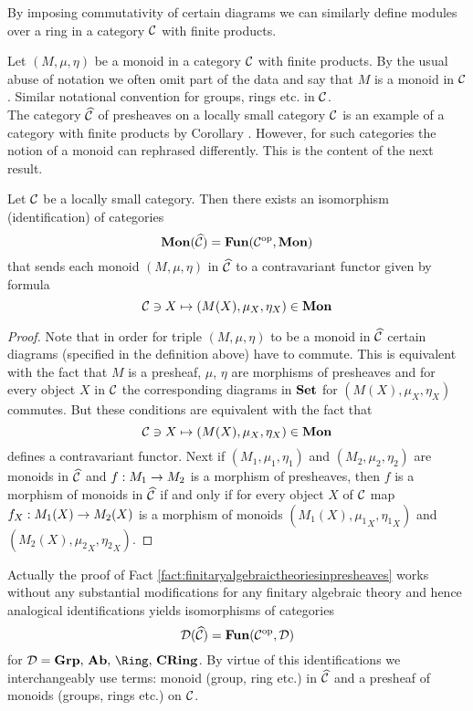 \begin{remark}
By imposing commutativity of certain diagrams we can similarly define modules over a ring in a category ${\mathcal C}$ with finite products.
\end{remark}
\noindent
Let $(M,\mu,\eta)$ be a monoid in a category ${\mathcal C}$ with finite products. By the usual abuse of notation we often omit part of the data and say that $M$ is a monoid in ${\mathcal C}$. Similar notational convention for groups, rings etc. in ${\mathcal C}$.\\
The category $\widehat{{\mathcal C}}$ of presheaves on a locally small category ${\mathcal C}$ is an example of a category with finite products by Corollary . However, for such categories the notion of a monoid can rephrased differently. This is the content of the next result.

\begin{fact}\label{fact:finitaryalgebraictheoriesinpresheaves}
Let ${\mathcal C}$ be a locally small category. Then there exists an isomorphism (identification) of categories
$$\mathbf{Mon}(\widehat{{\mathcal C}}) = \mathbf{Fun}({\mathcal C}^{\mathrm{op}},\mathbf{Mon})$$
that sends each monoid $(M,\mu,\eta)$ in $\widehat{{\mathcal C}}$ to a contravariant functor given by formula 
$${\mathcal C}\ni X\mapsto (M(X),\mu_X,\eta_X)\in \mathbf{Mon}$$
\end{fact}
\begin{proof}
Note that in order for triple $(M,\mu,\eta)$ to be a monoid in $\widehat{{\mathcal C}}$ certain diagrams (specified in the definition above) have to commute. This is equivalent with the fact that $M$ is a presheaf, $\mu$, $\eta$ are morphisms of presheaves and for every object $X$ in ${\mathcal C}$ the corresponding diagrams in $\mathbf{Set}$ for $(M(X),\mu_X,\eta_X)$ commutes. But these conditions are equivalent with the fact that 
$${\mathcal C}\ni X\mapsto (M(X),\mu_X,\eta_X)\in \mathbf{Mon}$$
defines a contravariant functor. Next if $(M_1,\mu_1,\eta_1)$ and $(M_2,\mu_2,\eta_2)$ are monoids in $\widehat{{\mathcal C}}$ and $f:M_1\rightarrow M_2$ is a morphism of presheaves, then $f$ is a morphism of monoids in $\widehat{{\mathcal C}}$ if and only if for every object $X$ of ${\mathcal C}$ map $f_X:M_1(X)\rightarrow M_2(X)$ is a morphism of monoids $(M_1(X),{\mu_1}_X,{\eta_1}_X)$ and $(M_2(X),{\mu_2}_X,{\eta_2}_X)$.
\end{proof}

\begin{remark}\label{remark:finitaryalgebraictheoriesinpresheaves}
Actually the proof of Fact \ref{fact:finitaryalgebraictheoriesinpresheaves} works without any substantial modifications for any finitary algebraic theory and hence analogical identifications yields isomorphisms of categories
$${\mathcal D}(\widehat{{\mathcal C}}) = \mathbf{Fun}({\mathcal C}^{\mathrm{op}},{\mathcal D})$$
for $\cD = \Grp,\,\Ab,\,\Ring,\,\CRing$.
By virtue of this identifications we interchangeably use terms: monoid (group, ring etc.) in $\widehat{{\mathcal C}}$ and a presheaf of monoids (groups, rings etc.) on ${\mathcal C}$.
\end{remark}





